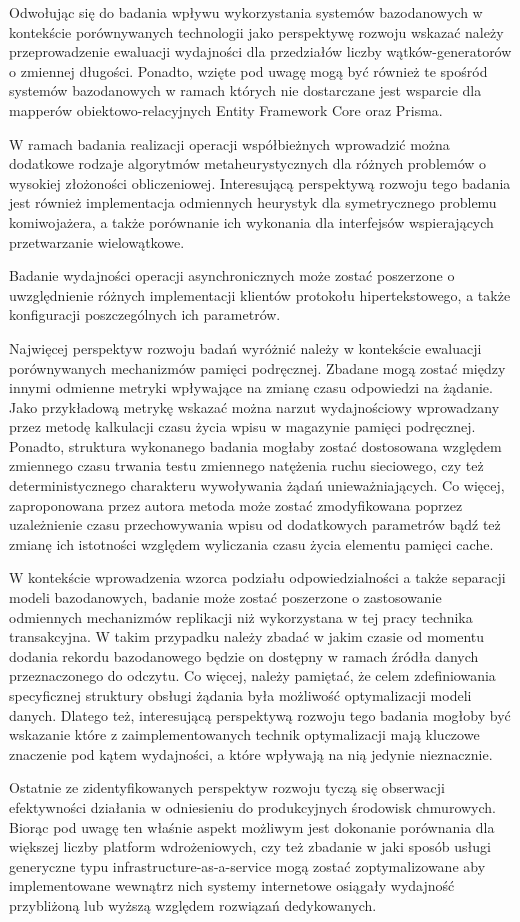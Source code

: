 Odwołując się do badania wpływu wykorzystania systemów bazodanowych w kontekście porównywanych technologii jako perspektywę rozwoju wskazać należy przeprowadzenie ewaluacji wydajności dla przedziałów liczby wątków-generatorów o zmiennej długości. Ponadto, wzięte pod uwagę mogą być również te spośród systemów bazodanowych w ramach których nie dostarczane jest wsparcie dla mapperów obiektowo-relacyjnych Entity Framework Core oraz Prisma.

W ramach badania realizacji operacji współbieżnych wprowadzić można dodatkowe rodzaje algorytmów metaheurystycznych dla różnych problemów o wysokiej złożoności obliczeniowej. Interesującą perspektywą rozwoju tego badania jest również implementacja odmiennych heurystyk dla symetrycznego problemu komiwojażera, a także porównanie ich wykonania dla interfejsów wspierających przetwarzanie wielowątkowe.

Badanie wydajności operacji asynchronicznych może zostać poszerzone o uwzględnienie różnych implementacji klientów protokołu hipertekstowego, a także konfiguracji poszczególnych ich parametrów.

Najwięcej perspektyw rozwoju badań wyróżnić należy w kontekście ewaluacji porównywanych mechanizmów pamięci podręcznej. Zbadane mogą zostać między innymi odmienne metryki wpływające na zmianę czasu odpowiedzi na żądanie. Jako przykładową metrykę wskazać można narzut wydajnościowy wprowadzany przez metodę kalkulacji czasu życia wpisu w magazynie pamięci podręcznej. Ponadto, struktura wykonanego badania mogłaby zostać dostosowana względem zmiennego czasu trwania testu zmiennego natężenia ruchu sieciowego, czy też deterministycznego charakteru wywoływania żądań unieważniających. Co więcej, zaproponowana przez autora metoda może zostać zmodyfikowana poprzez uzależnienie czasu przechowywania wpisu od dodatkowych parametrów bądź też zmianę ich istotności względem wyliczania czasu życia elementu pamięci cache.

W kontekście wprowadzenia wzorca podziału odpowiedzialności a także separacji modeli bazodanowych, badanie może zostać poszerzone o zastosowanie odmiennych mechanizmów replikacji niż wykorzystana w tej pracy technika transakcyjna. W takim przypadku należy zbadać w jakim czasie od momentu dodania rekordu bazodanowego będzie on dostępny w ramach źródła danych przeznaczonego do odczytu. Co więcej, należy pamiętać, że celem zdefiniowania specyficznej struktury obsługi żądania była możliwość optymalizacji modeli danych. Dlatego też, interesującą perspektywą rozwoju tego badania mogłoby być wskazanie które z zaimplementowanych technik optymalizacji mają kluczowe znaczenie pod kątem wydajności, a które wpływają na nią jedynie nieznacznie.

Ostatnie ze zidentyfikowanych perspektyw rozwoju tyczą się obserwacji efektywności działania w odniesieniu do produkcyjnych środowisk chmurowych. Biorąc pod uwagę ten właśnie aspekt możliwym jest dokonanie porównania dla większej liczby platform wdrożeniowych, czy też zbadanie w jaki sposób usługi generyczne typu infrastructure-as-a-service mogą zostać zoptymalizowane aby implementowane wewnątrz nich systemy internetowe osiągały wydajność przybliżoną lub wyższą względem rozwiązań dedykowanych. 
